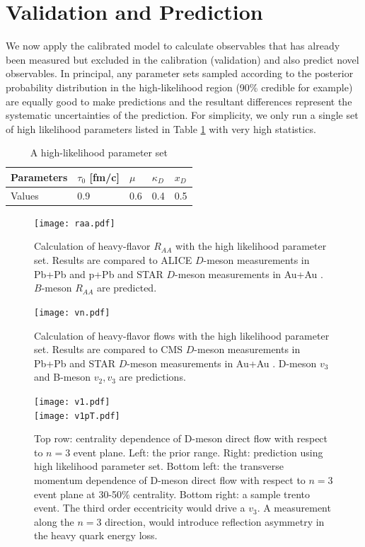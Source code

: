 \documentclass[aps, prc, reprint, amsmath, groupedaddress, nofootinbib]{revtex4-1}
\begin{document}
\section{Validation and Prediction}\label{section:prediction}
We now apply the calibrated model to calculate observables that has already been measured but excluded in the calibration (validation) and also predict novel observables.
In principal, any parameter sets sampled according to the posterior probability distribution in the high-likelihood region (90\% credible for example) are equally good to make predictions and the resultant differences represent the systematic uncertainties of the prediction.
For simplicity, we only run a single set of high likelihood parameters listed in Table \ref{table:high-likelihood-parameters} with very high statistics.
\begin{table}
\caption{A high-likelihood parameter set}\label{table:high-likelihood-parameters}
\begin{tabularx}{\columnwidth}{XXXXX}
\hline
Parameters & $\tau_0$ [fm/c] & $\mu$ & $\kappa_D$ & $x_D$   \\
\hline
Values & 0.9 & 0.6 & 0.4 & 0.5\\
\hline
\end{tabularx}
\end{table} 
\begin{figure}
\texttt{[image: raa.pdf]}
\caption{Calculation of heavy-flavor $R_{AA}$ with the high likelihood parameter set. Results are compared to ALICE $D$-meson measurements in Pb+Pb and p+Pb \cite{Abelev:2014hha,Abelev:2014hha} and STAR $D$-meson measurements in Au+Au \cite{Xie:2016iwq}. $B$-meson $R_{AA}$ are predicted.}\label{plots:pred:raa}
\end{figure}
\begin{figure}
\texttt{[image: vn.pdf]}
\caption{Calculation of heavy-flavor flows with the high likelihood parameter set. Results are compared to CMS $D$-meson measurements in Pb+Pb \cite{Sirunyan:2017plt} and STAR $D$-meson measurements in Au+Au \cite{Adamczyk:2017xur}. D-meson $v_3$ and B-meson $v_2, v_3$ are predictions.}\label{plots:pred:vn}
\end{figure}
\begin{figure}
\texttt{[image: v1.pdf]}\\
\texttt{[image: v1pT.pdf]}
\caption{Top row: centrality dependence of D-meson direct flow with respect to $n=3$ event plane. Left: the prior range. Right: prediction using high likelihood parameter set. Bottom left: the transverse momentum dependence of D-meson direct flow with respect to $n=3$ event plane at 30-50\% centrality. Bottom right: a sample trento event. The third order eccentricity would drive a $v_3$. A measurement along the $n=3$ direction, would introduce reflection asymmetry in the heavy quark energy loss.}\label{plots:pred:v1}
\end{figure}
\end{document}
